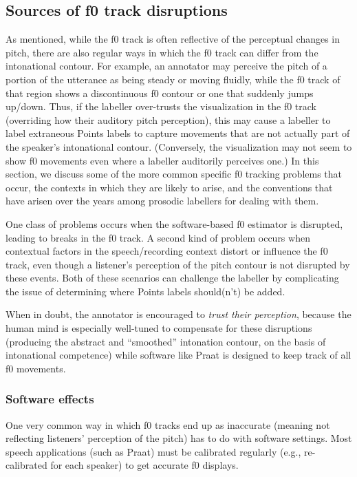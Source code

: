 \documentclass[11pt, twoside]{memoir}
\begin{document}
\subsection{Sources of f0 track disruptions}\label{sec:a-brief-overview-of-sources-of-pitch-track-disruptions}

As mentioned, while the f0 track is often reflective of the perceptual changes in pitch, there are also regular ways in which the f0 track can differ from the intonational contour. For example, an annotator may perceive the pitch of a portion of the utterance as being steady or moving fluidly, while the f0 track of that region shows a discontinuous f0 contour or one that suddenly jumps up\slash down. Thus, if the labeller over-trusts the visualization in the f0 track (overriding how their auditory pitch perception), this may cause a labeller to label extraneous Points labels to capture movements that are not actually part of the speaker’s intonational contour. (Conversely, the visualization may not seem to show f0 movements even where a labeller auditorily perceives one.) In this section, we discuss some of the more common specific f0 tracking problems that occur, the contexts in which they are likely to arise, and the conventions that have arisen over the years among prosodic labellers for dealing with them.

One class of problems occurs when the software-based f0 estimator is disrupted, leading to breaks in the f0 track. A second kind of problem occurs when contextual factors in the speech\slash recording context distort or influence the f0 track, even though a listener’s perception of the pitch contour is not disrupted by these events. Both of these scenarios can challenge the labeller by complicating the issue of determining where Points labels should(n’t) be added.

When in doubt, the annotator is encouraged to \emph{trust their perception}, because the human mind is especially well-tuned to compensate for these disruptions (producing the abstract and “smoothed” intonation contour, on the basis of intonational competence) while software like Praat is designed to keep track of all f0 movements.

\subsubsection{Software effects}\label{sec:software-effects}

One very common way in which f0 tracks end up as inaccurate (meaning not reflecting listeners’ perception of the pitch) has to do with software settings. Most speech applications (such as Praat) must be calibrated regularly (e.g., re-calibrated for each speaker) to get accurate f0 displays.
\end{document}
